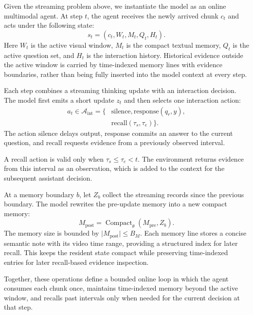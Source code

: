 Given the streaming problem above, we instantiate the model as an online multimodal agent.
At step \(t\), the agent receives the newly arrived chunk \(c_t\) and acts under the following state:
\begin{equation}
  s_t=(c_t,W_t,M_t,Q_t,H_t).
\end{equation}
Here \(W_t\) is the active visual window, \(M_t\) is the compact textual memory, \(Q_t\) is the active question set, and \(H_t\) is the interaction history.
Historical evidence outside the active window is carried by time-indexed memory lines with evidence boundaries, rather than being fully inserted into the model context at every step.

Each step combines a streaming thinking update with an interaction decision.
The model first emits a short update \(z_t\) and then selects one interaction action:
\begin{equation}
  \begin{aligned}
  a_t\in\mathcal A_{\mathrm{int}}
  =\{&\mathrm{silence},\mathrm{response}(q_r,y),\\
     &\mathrm{recall}(\tau_s,\tau_e)\}.
  \end{aligned}
\end{equation}
The action \(\mathrm{silence}\) delays output, \(\mathrm{response}\) commits an answer to the current question, and \(\mathrm{recall}\) requests evidence from a previously observed interval.

A recall action is valid only when \(\tau_s\le\tau_e<t\).
The environment returns evidence from this interval as an observation, which is added to the context for the subsequent assistant decision.

At a memory boundary \(b\), let \(Z_b\) collect the streaming records since the previous boundary.
The model rewrites the pre-update memory into a new compact memory:
\begin{equation}
  M_{\mathrm{post}}=\operatorname{Compact}_{\theta}(M_{\mathrm{pre}},Z_b).
\end{equation}
The memory size is bounded by \(\lvert M_{\mathrm{post}}\rvert\le B_M\).
Each memory line stores a concise semantic note with its video time range, providing a structured index for later recall.
This keeps the resident state compact while preserving time-indexed entries for later recall-based evidence inspection.

Together, these operations define a bounded online loop in which the agent consumes each chunk once, maintains time-indexed memory beyond the active window, and recalls past intervals only when needed for the current decision at that step.

